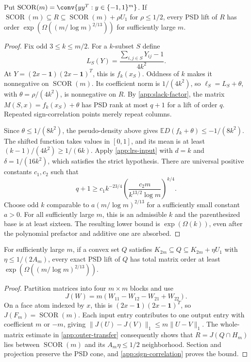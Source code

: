 \begin{lemma}\label{app:sign-correlation}
Put $\operatorname{SCOR}(m)=\conv\{yy^T:y\in\{-1,1\}^m\}$.
If $\operatorname{SCOR}(m)\subseteq R\subseteq
\operatorname{SCOR}(m)+\rho U_1$ for $\rho\le1/2$, every PSD lift
of $R$ has order $\exp(\Omega((m/\log m)^{2/13}))$ for sufficiently
large $m$.
\end{lemma}
\begin{proof}
Fix odd $3\le k\le m/2$. For a $k$-subset $S$ define
\[
 L_S(Y)=\frac{\sum_{i,j\in S}Y_{ij}-1}{4k^2}.
\]
At $Y=(2x-\mathbf1)(2x-\mathbf1)^T$, this is $f_k(x_S)$.
Oddness of $k$ makes it nonnegative on $\operatorname{SCOR}(m)$.
Its coefficient norm is $1/(4k^2)$, so
$\ell_S=L_S+\theta$, with $\theta=\rho/(4k^2)$, is nonnegative on
$R$. By \cref{app:slack-factor}, the matrix
$M(S,x)=f_k(x_S)+\theta$ has PSD rank at most $q+1$ for a lift of
order $q$. Repeated sign-correlation points merely repeat columns.

Since $\theta\le1/(8k^2)$, the pseudo-density above gives
$\mathbb ED(f_k+\theta)\le-1/(8k^2)$.
The shifted function takes values in $[0,1]$, and its mean is at least
$(k-1)/(4k^2)\ge1/(6k)$. Apply \eqref{app:lrs-input} with
$d=k$ and $\delta=1/(16k^2)$, which satisfies the strict hypothesis.
There are universal positive constants $c_1,c_2$ such that
\[
 q+1\ge c_1k^{-23/4}
 \left(\frac{c_2m}{k^{13/2}\log m}\right)^{k/4}.
\]
Choose odd $k$ comparable to $a(m/\log m)^{2/13}$ for a sufficiently
small constant $a>0$. For all sufficiently large $m$, this is an
admissible $k$ and the parenthesized base is at least sixteen.
The resulting lower bound is $\exp(\Omega(k))$, even after the
polynomial prefactor and additive one are absorbed.
\end{proof}

\begin{theorem}\label{app:approx-sdp}
For sufficiently large $m$, if a convex set $Q$ satisfies
$K_{2m}\subseteq Q\subseteq K_{2m}+\eta U_1$ with
$\eta\le1/(2A_m)$, every exact PSD lift of $Q$ has total matrix
order at least $\exp(\Omega((m/\log m)^{2/13}))$.
\end{theorem}
\begin{proof}
Partition matrices into four $m\times m$ blocks and use
\[
 J(W)=m(W_{11}-W_{12}-W_{21}+W_{22}).
\]
On a face atom indexed by $x$, this is
$(2x-\mathbf1)(2x-\mathbf1)^T$, so $J(F_m)=\operatorname{SCOR}(m)$.
Each input entry contributes to one output entry with coefficient
$m$ or $-m$, giving $\|J(U)-J(V)\|_1\le m\|U-V\|_1$.
The whole-matrix estimate in \cref{app:outer-transfer} consequently
shows that $R=J(Q\cap H_m)$ lies between $\operatorname{SCOR}(m)$
and its $A_m\eta\le1/2$ neighborhood. Section and projection preserve
the PSD cone, and \cref{app:sign-correlation} proves the bound.
\end{proof}

